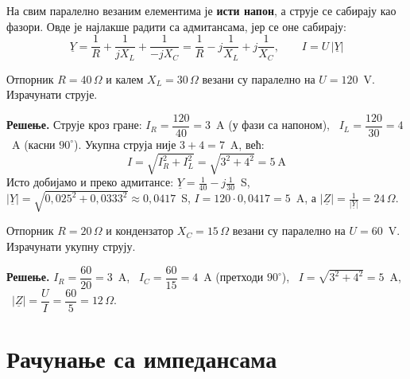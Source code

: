 \documentclass{article}
\begin{document}
На свим паралелно везаним елементима је \textbf{исти напон}, а струје се
сабирају као фазори. Овде је најлакше радити са адмитансама, јер се оне
сабирају:
\[
\underline{Y} = \frac{1}{R} + \frac{1}{jX_L} + \frac{1}{-jX_C}
= \frac{1}{R} - j\frac{1}{X_L} + j\frac{1}{X_C},
\qquad I = U\,|\underline{Y}|
\]

\begin{primer}
Отпорник $R = 40\,\Omega$ и калем $X_L = 30\,\Omega$ везани су паралелно на
$U = 120$~V. Израчунати струје.

\textbf{Решење.}
Струје кроз гране:
$I_R = \dfrac{120}{40} = 3$~A (у фази са напоном), \
$I_L = \dfrac{120}{30} = 4$~A (касни $90^\circ$).
Укупна струја није $3 + 4 = 7$~A, већ:
\[
I = \sqrt{I_R^2 + I_L^2} = \sqrt{3^2 + 4^2} = 5~\text{A}
\]
Исто добијамо и преко адмитансе:
$\underline{Y} = \frac{1}{40} - j\frac{1}{30}$~S,
$|\underline{Y}| = \sqrt{0{,}025^2 + 0{,}0333^2} \approx 0{,}0417$~S,
$I = 120\cdot 0{,}0417 = 5$~A, а $|\underline{Z}| = \frac{1}{|\underline{Y}|} = 24\,\Omega$.

\begin{center}
\end{center}
\end{primer}

\begin{primer}
Отпорник $R = 20\,\Omega$ и кондензатор $X_C = 15\,\Omega$ везани су паралелно
на $U = 60$~V. Израчунати укупну струју.

\textbf{Решење.}
$I_R = \dfrac{60}{20} = 3$~A, \
$I_C = \dfrac{60}{15} = 4$~A (претходи $90^\circ$), \
$I = \sqrt{3^2 + 4^2} = 5$~A, \
$|\underline{Z}| = \dfrac{U}{I} = \dfrac{60}{5} = 12\,\Omega$.
\end{primer}

\section{Рачунање са импедансама}
\end{document}
